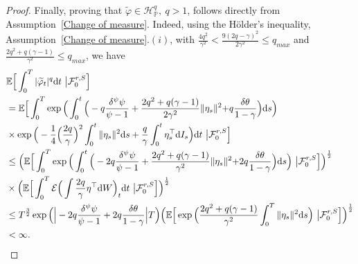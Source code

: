 \documentclass[10pt,a4paper]{amsart}
\begin{document}
\begin{proof}
	Finally, proving that $\widetilde{\varphi}\in\mathcal{H}_{\mathbb{P}}^{q},~q>1$, follows directly from Assumption~\ref{Change of measure}. Indeed, using the H{\"o}lder's inequality, Assumption~\ref{Change of measure}$.(i)$,  with $\frac{4q^{2}}{\gamma^{2}}<\frac{9(2q-\gamma)^{2}}{2\gamma^{2}}\le q_{max}$ and $\frac{2q^{2}+q(\gamma-1)}{\gamma^{2}}\le q_{max}$, we have
	\begin{align*}
		&\mathbb{E}\Big[\int_{0}^{T}|\widetilde{\varphi}_{t}|^{q}\mathrm{d}t~\big|\mathcal{F}_{0}^{r,S}\Big]\notag\\
		&=\mathbb{E}\Big[\int_{0}^{T}\exp\Big(\int_{0}^{t}\Big(-q\frac{\delta^{\psi}\psi}{\psi-1}+\frac{2q^{2}+q(\gamma-1)}{2\gamma^{2}}\|\eta_{s}\|^{2}{+q\frac{\delta\theta}{1-\gamma}}\Big)\mathrm{d}s\Big)\notag\\
		&\times\exp\Big(-\frac{1}{4}\Big(\frac{2q}{\gamma}\Big)^{2}\int_{0}^{t}\|\eta_{s}\|^{2}\mathrm{d}s+\frac{q}{\gamma}\int_{0}^{t}\eta_{s}^{\top}\mathrm{d}I_{s}\Big)\mathrm{d}t~\big|\mathcal{F}_{0}^{r,S}\Big]\notag\\
		&\le\Big(\mathbb{E}\Big[\int_{0}^{T}\exp\Big(\int_{0}^{t}\Big(-2q\frac{\delta^{\psi}\psi}{\psi-1}+\frac{2q^{2}+q(\gamma-1)}{\gamma^{2}}\|\eta_{s}\|^{2}{+2q\frac{\delta\theta}{1-\gamma}}\Big)\mathrm{d}s\Big)~\big|\mathcal{F}_{0}^{r,S}\Big]\Big)^{\frac{1}{2}}\notag\\
		&\times\Big(\mathbb{E}\Big[\int_{0}^{T}\mathcal{E}\Big(\int\frac{2q}{\gamma}\eta^{\top}\mathrm{d}W\Big)_{t}\mathrm{d}t~\big|\mathcal{F}_{0}^{r,S}\Big]\Big)^{\frac{1}{2}}\notag\\
		&\le T^{\frac{3}{2}}\exp\Big(\Big|-2q\frac{\delta^{\psi}\psi}{\psi-1}+2q\frac{\delta\theta}{1-\gamma}\Big|T\Big)\Big(\mathbb{E}\Big[\exp\Big(\frac{2q^{2}+q(\gamma-1)}{\gamma^{2}}\int_{0}^{T}\|\eta_{s}\|^{2}\mathrm{d}s\Big)~\big|\mathcal{F}_{0}^{r,S}\Big]\Big)^{\frac{1}{2}}\notag\\
		&<\infty.
	\end{align*}
	

\end{proof}
\end{document}
